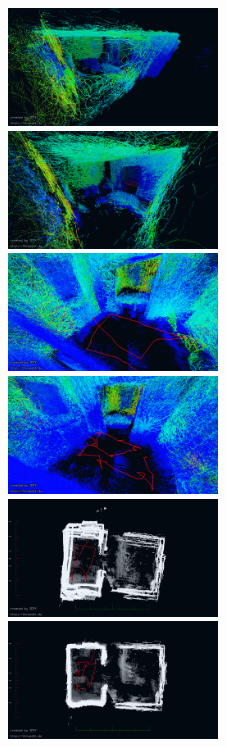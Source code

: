\begin{figure}
        \centering
        \includegraphics[width=0.495\textwidth]{./images/jasper_uncorr_corner}\hfill
        \includegraphics[width=0.495\textwidth]{./images/jasper_corr_corner}\\
	\includegraphics[width=0.495\textwidth]{./images/jasper_uncorr_color}\hfill
	\includegraphics[width=0.495\textwidth]{./images/jasper_corr_color}\\
        \includegraphics[width=0.495\textwidth]{./images/jasper_uncorr_top}\hfill
        \includegraphics[width=0.495\textwidth]{./images/jasper_corr_top}

\end{figure}
